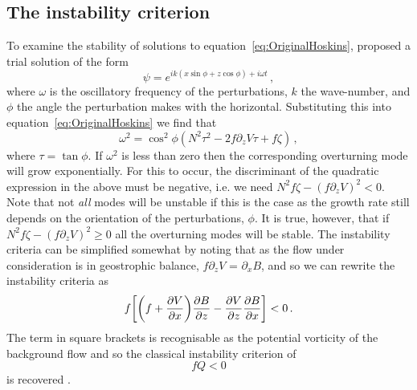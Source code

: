     \subsection{The instability criterion}
    \label{subsec:InstabilityCriterion}
    To examine the stability of solutions to equation~\ref{eq:OriginalHoskins}, \citet{Hoskins1974} proposed a trial solution of the form
    \begin{equation}
        \psi = e^{i k(x\sin\phi + z\cos \phi) + i \omega t} \, ,    
    \end{equation}
    where $\omega$ is the oscillatory frequency of the perturbations, $k$ the wave-number, and $\phi$ the angle the perturbation makes with the horizontal. Substituting this into equation~\ref{eq:OriginalHoskins} we find that
    \begin{equation}
        \label{eq:GrowthRate}
        \omega^2 = \cos^2\phi (N^2 \tau^2 - 2f\partial_zV\tau + f\zeta) \, ,
    \end{equation}
    where $\tau = \tan\phi$. If $\omega^2$ is less than zero then the corresponding overturning mode will grow exponentially. For this to occur, the discriminant of the quadratic expression in the above must be negative, i.e. we need $N^2 f \zeta - (f\partial_z V)^2 < 0$. Note that not \textit{all} modes will be unstable if this is the case as the growth rate still depends on the orientation of the perturbations, $\phi$. It is true, however, that if $N^2 f \zeta - (f\partial_z V)^2 \geq 0$ all the overturning modes will be stable. The instability criteria can be simplified somewhat by noting that as the flow under consideration is in geostrophic balance, $f\partial_zV$ = $\partial_x B$, and so we can rewrite the instability criteria as
    \begin{equation}
        f \bigg[\bigg(f + \pdv{V}{x}\bigg)\pdv{B}{z} - \pdv{V}{z}\pdv{B}{x}\bigg] < 0 \, .
    \end{equation}
    The term in square brackets is recognisable as the potential vorticity of the background flow and so the classical instability criterion of
    \begin{equation}
        f Q < 0
    \end{equation}
    is recovered \citep{Hoskins1974}.

